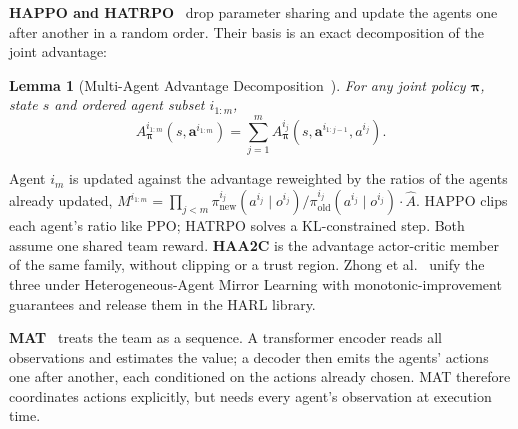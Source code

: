 \documentclass[11pt]{article}
\newtheorem{lemma}{Lemma}
\begin{document}
\textbf{HAPPO and HATRPO}~\cite{kuba2022happo} drop parameter sharing and update the agents one after another in a random order. Their basis is an exact decomposition of the joint advantage:
\begin{lemma}[Multi-Agent Advantage Decomposition~\cite{kuba2022happo}]
For any joint policy $\boldsymbol{\pi}$, state $s$ and ordered agent subset $i_{1:m}$,
\begin{equation}
A_{\boldsymbol{\pi}}^{i_{1:m}}(s, \mathbf{a}^{i_{1:m}}) = \sum_{j=1}^m A_{\boldsymbol{\pi}}^{i_j}\!\left(s, \mathbf{a}^{i_{1:j-1}}, a^{i_j}\right).
\end{equation}
\end{lemma}
Agent $i_m$ is updated against the advantage reweighted by the ratios of the agents already updated, $M^{i_{1:m}} = \prod_{j<m} \pi^{i_j}_{\text{new}}(a^{i_j} \mid o^{i_j}) / \pi^{i_j}_{\text{old}}(a^{i_j} \mid o^{i_j}) \cdot \hat{A}$. HAPPO clips each agent's ratio like PPO; HATRPO solves a KL-constrained step. Both assume one shared team reward. \textbf{HAA2C} is the advantage actor-critic member of the same family, without clipping or a trust region. Zhong et al.~\cite{zhong2024harl} unify the three under Heterogeneous-Agent Mirror Learning with monotonic-improvement guarantees and release them in the HARL library.

\textbf{MAT}~\cite{wen2022mat} treats the team as a sequence. A transformer encoder reads all observations and estimates the value; a decoder then emits the agents' actions one after another, each conditioned on the actions already chosen. MAT therefore coordinates actions explicitly, but needs every agent's observation at execution time.

\begin{table}[t]
\centering
\caption{The learners used in this report. ``Sharing'' refers to the actor parameters.}
\label{tab:learners}
\small
{}
\end{table}
\end{document}
